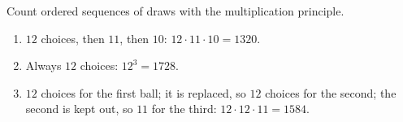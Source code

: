 Count ordered sequences of draws with the multiplication principle.
\begin{enumerate}
\item[(a)] $12$ choices, then $11$, then $10$: $12\cdot11\cdot10=\boxed{1320}$.
\item[(b)] Always $12$ choices: $12^3=\boxed{1728}$.
\item[(c)] $12$ choices for the first ball; it is replaced, so $12$ choices for the second; the second is kept out, so $11$ for the third: $12\cdot12\cdot11=\boxed{1584}$.
\end{enumerate}
